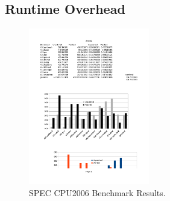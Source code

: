 %
%
%
%
%

\subsection{Runtime Overhead}
\label{section:typeshieldoverheadperformance}
\begin{figure}[h!]
    \centering
    \includegraphics[width=0.47\textwidth]{figures/spec_cpu2006.pdf}
    \caption{SPEC CPU2006 Benchmark Results.
    }
    \vspace{-.5cm}
    \label{fig:awesome_image}
\end{figure}

